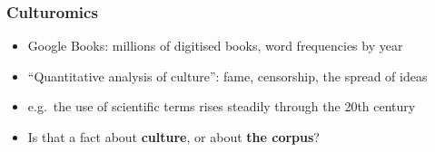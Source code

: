 \begin{frame}
\frametitle{Culturomics}
\centering

\begin{itemize}
  \item Google Books: millions of digitised books, word frequencies by year
  \vspace{6pt}
  \item ``Quantitative analysis of culture'': fame, censorship, the spread of ideas
  \vspace{6pt}
  \item<2-> e.g.\ the use of scientific terms rises steadily through the 20th century
  \vspace{6pt}
  \item<3-> Is that a fact about \textbf{culture}, or about \textbf{the corpus}?
\end{itemize}

\vspace{8pt}
{\footnotesize {}}

\end{frame}

